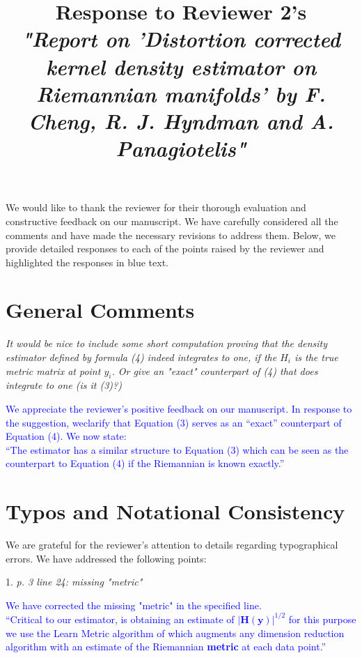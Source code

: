 \documentclass{article}
\date{\vspace{-8ex}}
\begin{document}
\title{Response to Reviewer 2's \\ \textit{"Report on 'Distortion corrected kernel density estimator on Riemannian manifolds' by F. Cheng, R. J. Hyndman and A. Panagiotelis"} }

\maketitle

We would like to thank the reviewer for their thorough evaluation and constructive feedback on our manuscript. We have carefully considered all the comments and have made the necessary revisions to address them. Below, we provide detailed responses to each of the points raised by the reviewer and highlighted the responses in blue text.

\section*{General Comments}

\textit{It would be nice to include some short computation proving that the density estimator defined by formula (4) indeed integrates to one, if the \(H_{i}\) is the true metric matrix at point \(y_{i}\). Or give an "exact" counterpart of (4) that does integrate to one (is it (3)?)}

\textcolor{blue}{We appreciate the reviewer's positive feedback on our manuscript. In response to the suggestion, weclarify that Equation (3) serves as an ``exact'' counterpart of Equation (4). We now state:\\
	``The estimator has a similar structure to Equation (3) which can be seen as the counterpart to Equation (4) if the Riemannian is known exactly.''
}

\section*{Typos and Notational Consistency}

We are grateful for the reviewer's attention to details regarding typographical errors. We have addressed the following points:

1. \textit{p. 3 line 24: missing "metric"}

   \textcolor{blue}{%
   We have corrected the missing "metric" in the specified line. \\
   ``Critical to our estimator, is obtaining an estimate of $|\bm{H}(\bm{y})|^{1/2}$ for this purpose we use the Learn Metric algorithm of \textcite{Perrault-Joncas2013-pq} which augments any dimension reduction algorithm with an estimate of the Riemannian \textbf{metric} at each data point.''
   }
\end{document}
